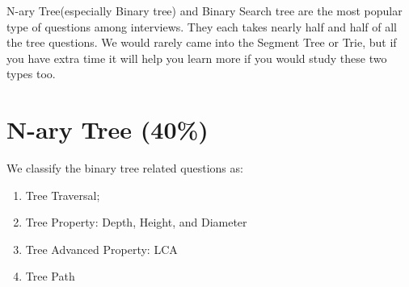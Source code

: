 \documentclass[../main.tex]{subfiles}
\begin{document}
N-ary Tree(especially Binary tree) and Binary Search tree are the most popular type of questions among interviews. They each takes nearly half and half of all the tree questions. We would rarely came into the Segment Tree or Trie, but if you have extra time it will help you learn more if you would study these two types too.  
\section{N-ary Tree (40\%)}
We classify the binary tree related questions as:
\begin{enumerate}
    \item Tree Traversal;
    \item Tree Property: Depth, Height, and Diameter
    \item Tree Advanced Property: LCA 
    \item Tree Path
\end{enumerate}
\end{document}
